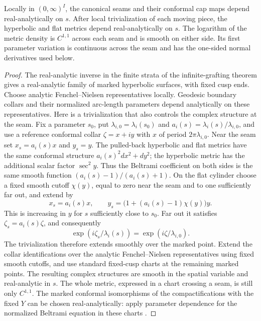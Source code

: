 \begin{lemma}\label{A2b-regularity}
Locally in $(0,\infty)^I$, the canonical seams and their conformal cap
maps depend real-analytically on $s$. After local trivialization of each
moving piece, the hyperbolic and flat metrics depend real-analytically
on $s$. The logarithm of the metric density is $C^{1,1}$
across each seam and is smooth on either side. Its first parameter
variation is continuous across the seam and has the one-sided normal
derivatives used below.
\end{lemma}
\begin{proof}
The real-analytic inverse in the finite strata of the infinite-grafting
theorem gives a real-analytic family of marked hyperbolic surfaces, with
fixed cusp ends. Choose analytic Fenchel--Nielsen representatives locally.
Geodesic boundary collars and their normalized arc-length parameters
depend analytically on these representatives. Here is a trivialization
that also controls the complex structure at the seam. Fix a parameter
$s_0$, put $\lambda_{i,0}=\lambda_i(s_0)$ and
$a_i(s)=\lambda_i(s)/\lambda_{i,0}$, and use a reference conformal collar
$\zeta=x+iy$ with $x$ of period $2\pi\lambda_{i,0}$.
Near the seam set $x_s=a_i(s)x$ and $y_s=y$.
The pulled-back hyperbolic and flat metrics have the same conformal
structure $a_i(s)^2dx^2+dy^2$; the hyperbolic metric has the additional
scalar factor $\sec^2y$. Thus the Beltrami coefficient on both sides is
the same smooth function $(a_i(s)-1)/(a_i(s)+1)$.
On the flat cylinder choose a fixed smooth cutoff $\chi(y)$, equal to
zero near the seam and to one sufficiently far out, and extend by
\[
 x_s=a_i(s)x,\qquad
 y_s=\bigl(1+(a_i(s)-1)\chi(y)\bigr)y.
\]
This is increasing in $y$ for $s$ sufficiently close to $s_0$.
Far out it satisfies $\zeta_s=a_i(s)\zeta$, and consequently
\[
 \exp(i\zeta_s/\lambda_i(s))
   =\exp(i\zeta/\lambda_{i,0}).
\]
The trivialization therefore extends smoothly over the marked point.
Extend the collar identifications over the analytic Fenchel--Nielsen
representatives using fixed smooth cutoffs, and use standard fixed-cusp
charts at the remaining marked points. The resulting complex structures
are smooth in the spatial variable and real-analytic in $s$.
The whole metric, expressed in a chart crossing a seam, is still only
$C^{1,1}$.
The marked conformal isomorphisms of the compactifications with the fixed
$Y$ can be chosen real-analytically: apply parameter dependence for the
normalized Beltrami equation in these charts
\cite[\S5.7, Theorems 10--11, pp.~402--403]{AhlforsBers1960A2b}.

\end{proof}
